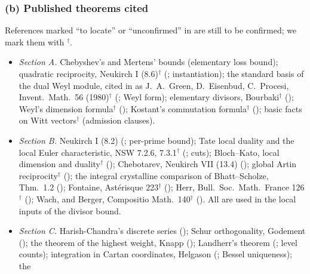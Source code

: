 \documentclass[10pt]{amsart}
\theoremstyle{definition}
\theoremstyle{remark}
\begin{document}
\subsubsection*{(b) Published theorems cited}
References marked ``to locate'' or ``unconfirmed'' in \cite{Annex} are
still to be confirmed; we mark them with $^\dagger$.
\begin{itemize}
\item \emph{Section A.} Chebyshev's and Mertens' bounds (elementary loss
bound); quadratic reciprocity, Neukirch I (8.6)$^\dagger$
(\cite[Theorem~\ref{A-i1:thm-qr}]{Annex}; instantiation); the standard basis
of the dual Weyl module, cited in \cite{Annex} as J.~A.~Green,
D.~Eisenbud, C.~Procesi, Invent.\ Math.\ 56 (1980)$^\dagger$
(\cite[Theorem~\ref{A-i1:thm-stdbasis}]{Annex}; Weyl form); elementary
divisors, Bourbaki$^\dagger$ (\cite[Theorem~\ref{A-i1:thm-elemdiv}]{Annex});
Weyl's dimension formula$^\dagger$ (\cite[Theorem~\ref{A-i1:thm-weyl}]{Annex});
Kostant's commutation formula$^\dagger$
(\cite[Theorem~\ref{A-i1:thm-kostant}]{Annex}); basic facts on Witt
vectors$^\dagger$ (admission clauses).
\item \emph{Section B.} Neukirch I (8.2)
(\cite[Theorem~\ref{A-i2:thm-fund}]{Annex}; per-prime bound); Tate local
duality and the local Euler characteristic, NSW 7.2.6, 7.3.1$^\dagger$
(\cite[Theorems~\ref{A-i2:thm-tate}, \ref{A-i2:thm-euler}]{Annex}; cuts);
Bloch--Kato, local dimension and duality$^\dagger$
(\cite[Theorem~\ref{A-i2:thm-bk}]{Annex}); Chebotarev, Neukirch VII (13.4)
(\cite[Theorem~\ref{A-i2:thm-cheb}]{Annex}); global Artin
reciprocity$^\dagger$ (\cite[Theorem~\ref{A-i2:thm-artin}]{Annex}); the
integral crystalline comparison of Bhatt--Scholze, Thm.~1.2
(\cite[Theorem~\ref{A-i2:thm-bs}]{Annex}); Fontaine, Ast\'erisque 223$^\dagger$
(\cite[Theorem~\ref{A-i2:thm-fontaine}]{Annex}); Herr, Bull.\ Soc.\ Math.\
France 126$^\dagger$ (\cite[Theorem~\ref{A-i2:thm-herr}]{Annex}); Wach, and
Berger, Compositio Math.\ 140$^\dagger$ (\cite[Theorem~\ref{A-i2:thm-wach}]{Annex}). All are
used in the local inputs of the divisor bound.
\item \emph{Section C.} Harish-Chandra's discrete series
(\cite[Theorem~\ref{A-i3:thm-hc}]{Annex}); Schur orthogonality, Godement
(\cite[Theorem~\ref{A-i3:thm-godement}]{Annex}); the theorem of the highest
weight, Knapp (\cite[Theorem~\ref{A-i3:thm-knapp}]{Annex}); Landherr's
theorem (\cite[Theorem~\ref{A-i3:thm-landherr}]{Annex}; level counts);
integration in Cartan coordinates, Helgason
(\cite[Theorem~\ref{A-i3:thm-helgason}]{Annex}; Bessel uniqueness); the

\end{itemize}
\end{document}
